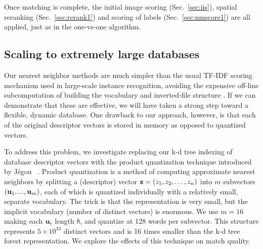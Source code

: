 Once matching is complete, the initial image scoring
(Sec.~\ref{sec:iis}), spatial reranking (Sec.~\ref{sec:rerank1}) and
scoring of labels (Sec.~\ref{sec:nmscore1}) are all applied, just as in
the one-vs-one algorithm.


\subsection{Scaling to extremely large databases}

Our nearest neighbor methods are much simpler than the usual TF-IDF
scoring mechanism used in large-scale instance recognition, avoiding
the expensive off-line subcomputation of building the vocabulary and
inverted-file structure \cite{cvpr07PhilbinObjRetriev}.
If we can demonstrate that these are
effective, we will have taken a strong step toward a flexible, dynamic
database.  One drawback to our approach, however, is that each of the
original descriptor vectors is stored in memory as opposed to
quantized vectors.

To address this problem, we investigate replacing our k-d tree
indexing of database descriptor vectors with the product
quantization technique introduced by J\'{e}gou \etal~\cite{pami11JegouDouzeSchmidProdQuant}.
Product quantization is a method of computing
approximate nearest neighbors by splitting a (descriptor) vector
$\mathbf{z} = (z_1, z_2, \ldots, z_n)$ into $m$
subvectors $(\mathbf{u}_1, ..., \mathbf{u}_m)$, each of which is quantized
individually with a relatively small, separate vocabulary.  The
trick is that the representation is very small, but the implicit
vocabulary (number of distinct vectors) is enormous.  We use $m=16$
making each $\mathbf{u}_i$ length 8, and quantize at 128 words per
subvector.  This structure represents $5 \times 10^{33}$ distinct vectors and is 16 times smaller than the k-d
tree forest representation.  We explore the effects of this technique on match
quality.
